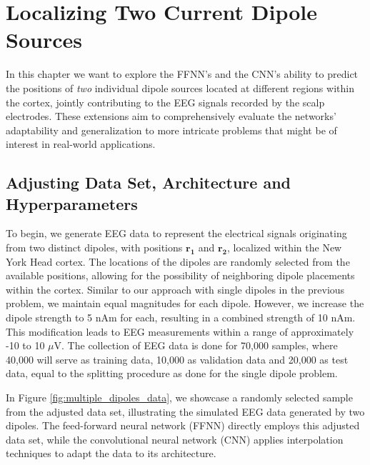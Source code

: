 \documentclass[a4paper, UKenglish, 11pt]{uiomaster}
\begin{document}
\chapter{Localizing Two Current Dipole Sources} \label{chap:two_dipole_FFNN}
In this chapter we want to explore the FFNN's and the CNN's ability to predict the positions of \emph{two} individual dipole sources located at different regions within the cortex, jointly contributing to the EEG signals recorded by the scalp electrodes. These extensions aim to comprehensively evaluate the networks' adaptability and generalization to more intricate problems that might be of interest in real-world applications.


\section{Adjusting Data Set, Architecture and Hyperparameters}
To begin, we generate EEG data to represent the electrical signals originating from two distinct dipoles, with positions $\mathbf{r_1}$ and $\mathbf{r_2}$, localized within the New York Head cortex. The locations of the dipoles are randomly selected from the available positions, allowing for the possibility of neighboring dipole placements within the cortex. Similar to our approach with single dipoles in the previous problem, we maintain equal magnitudes for each dipole. However, we increase the dipole strength to 5 nAm for each, resulting in a combined strength of 10 nAm. This modification leads to EEG measurements within a range of approximately -10 to 10 $\mu$V. The collection of EEG data is done for 70,000 samples, where 40,000 will serve as training data, 10,000 as validation data and 20,000 as test data, equal to the splitting procedure as done for the single dipole problem.

In Figure \ref{fig:multiple_dipoles_data}, we showcase a randomly selected sample from the adjusted data set, illustrating the simulated EEG data generated by two dipoles. The feed-forward neural network (FFNN) directly employs this adjusted data set, while the convolutional neural network (CNN) applies interpolation techniques to adapt the data to its architecture.
\end{document}
